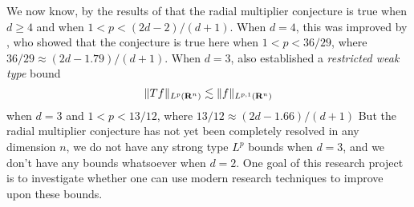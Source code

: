 \begin{remark}
\end{remark}

We now know, by the results of \cite{HeoandNazarovandSeeger} that the radial multiplier conjecture is true when $d \geq 4$ and when $1 < p < (2d-2)/(d+1)$. When $d = 4$, this was improved by \cite{Cladek}, who showed that the conjecture is true here when $1 < p < 36/29$, where $36/29 \approx (2d - 1.79)/(d+1)$. When $d = 3$, \cite{Cladek} also established a \emph{restricted weak type} bound
% 
\[ \| Tf \|_{L^p(\operatorname{\mathbf{R}}^n)} \lesssim \| f \|_{L^{p,1}(\operatorname{\mathbf{R}}^n)} \]
when $d = 3$ and $1 < p < 13/12$, where $13/12 \approx (2d - 1.66)/(d+1)$ But the radial multiplier conjecture has not yet been completely resolved in any dimension $n$, we do not have any strong type $L^p$ bounds when $d = 3$, and we don't have any bounds whatsoever when $d = 2$. One goal of this research project is to investigate whether one can use modern research techniques to improve upon these bounds.

